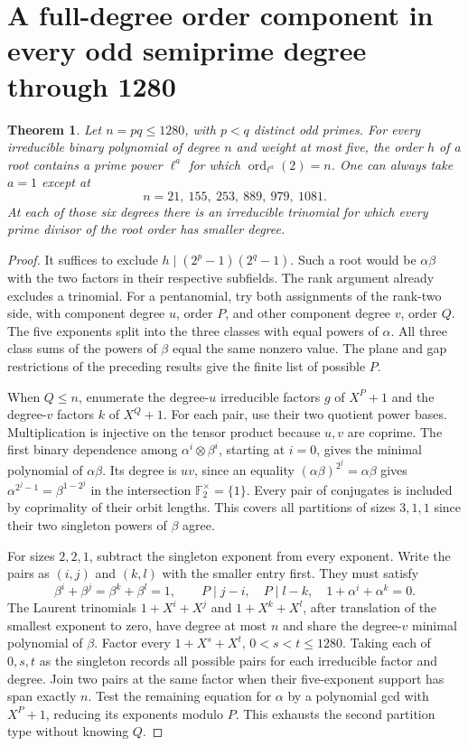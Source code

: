 \documentclass[11pt]{article}
\newtheorem{theorem}{Theorem}
\newcommand{\ord}{\operatorname{ord}}
\begin{document}
\section{A full-degree order component in every odd semiprime degree through 1280}
\begin{theorem}\label{thm:semiprime-census}
Let \(n=pq\le1280\), with \(p<q\) distinct odd primes. For every
irreducible binary polynomial of degree \(n\) and weight at most five,
the order \(h\) of a root contains a prime power \(\ell^a\) for which
\(\ord_{\ell^a}(2)=n\). One can always take \(a=1\) except at
\[
                     n=21,\ 155,\ 253,\ 889,\ 979,\ 1081.
\]
At each of those six degrees there is an irreducible trinomial for
which every prime divisor of the root order has smaller degree.
\end{theorem}
\begin{proof}
It suffices to exclude \(h\mid(2^p-1)(2^q-1)\). Such a root would
be \(\alpha\beta\) with the two factors in their respective subfields.
The rank argument already excludes a trinomial. For a pentanomial,
try both assignments of the rank-two side, with component degree
\(u\), order \(P\), and other component degree \(v\), order \(Q\).
The five exponents split into the three classes with equal powers
of \(\alpha\). All three class sums of the powers of \(\beta\)
equal the same nonzero value. The plane and gap restrictions of
the preceding results give the finite list of possible \(P\).

When \(Q\le n\), enumerate the degree-\(u\) irreducible factors \(g\)
of \(X^P+1\) and the degree-\(v\) factors \(k\) of \(X^Q+1\).
For each pair, use their two quotient power bases. Multiplication
is injective on the tensor product because \(u,v\) are coprime.
The first binary dependence among
\(\alpha^i\otimes\beta^i\), starting at \(i=0\), gives the minimal
polynomial of \(\alpha\beta\).
Its degree is \(uv\), since an equality
\((\alpha\beta)^{2^j}=\alpha\beta\) gives
\(\alpha^{2^j-1}=\beta^{1-2^j}\) in the intersection
\(\mathbb F_2^\times=\{1\}\). Every pair of conjugates is included
by coprimality of their orbit lengths.
This covers all partitions of sizes \(3,1,1\) since their two
singleton powers of \(\beta\) agree.

For sizes \(2,2,1\), subtract the singleton exponent from every
exponent. Write the pairs as \((i,j)\) and \((k,l)\) with the
smaller entry first. They must satisfy
\[
 \beta^i+\beta^j=\beta^k+\beta^l=1,\qquad
 P\mid j-i,\quad P\mid l-k,\quad 1+\alpha^i+\alpha^k=0 .
\]
The Laurent trinomials \(1+X^i+X^j\) and \(1+X^k+X^l\), after
translation of the smallest exponent to zero, have degree at most
\(n\) and share the degree-\(v\) minimal polynomial of \(\beta\).
Factor every \(1+X^s+X^t\), \(0<s<t\le1280\). Taking each of
\(0,s,t\) as the singleton records all possible pairs for each
irreducible factor and degree. Join two pairs at the same factor
when their five-exponent support has span exactly \(n\). Test the
remaining equation for \(\alpha\) by a polynomial gcd with \(X^P+1\),
reducing its exponents modulo \(P\). This exhausts the second
partition type without knowing \(Q\).


\end{proof}
\end{document}

